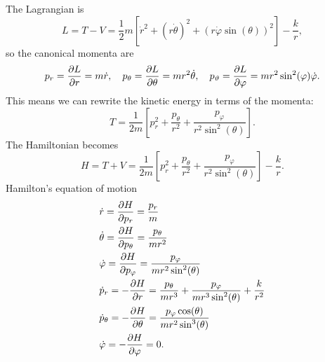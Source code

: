 \documentclass{article}
\begin{document}
        The Lagrangian is 
        \begin{equation*}
            L = T - V = \frac{1}{2}m \left[\dot r^2 + (r \dot \theta)^2 + (r \dot \varphi \sin(\theta))^2\right] - \frac{k}{r},
        \end{equation*}
        so the canonical momenta are
        \begin{equation*}
            p_r = \pdv{L}{r} = m \dot r, \quad p_\theta = \pdv{L}{\theta} = m r^2 \dot \theta, \quad p_\vartheta = \pdv{L}{\varphi} = m r^2 \sin^2(\varphi) \dot \varphi.
        \end{equation*}
        This means we can rewrite the kinetic energy in terms of the momenta:
        \begin{equation*}
            T = \frac{1}{2m} \left[p_r^2 +\frac{p_\theta}{r^2} + \frac{p_\varphi}{r^2 \sin^2(\theta)}\right].
        \end{equation*}
        The Hamiltonian becomes
        \begin{equation*}
            H = T + V = \frac{1}{2m} \left[p_r^2 +\frac{p_\theta}{r^2} + \frac{p_\varphi}{r^2 \sin^2(\theta)}\right] - \frac{k}{r}.
        \end{equation*}
        Hamilton's equation of motion
        \begin{align*}
            & \dot r = \pdv{H}{p_r} = \frac{p_r}{m} \\
            & \dot \theta = \pdv{H}{p_\theta} = \frac{p_\theta}{m r^2} \\
            & \dot \varphi = \pdv{H}{p_\varphi} = \frac{p_\varphi}{m r^2 \sin^2(\theta)} \\
            & \dot p_r = - \pdv{H}{r} = \frac{p_\theta}{m r^3} + \frac{p_\varphi}{m r^3 \sin^2(\theta)} + \frac{k}{r^2} \\
            & \dot p_\theta = - \pdv{H}{\theta} = \frac{p_\varphi \cos(\theta)}{m r^2 \sin^3(\theta)} \\
            & \dot \varphi = - \pdv{H}{\varphi} = 0.
        \end{align*}
\end{document}
